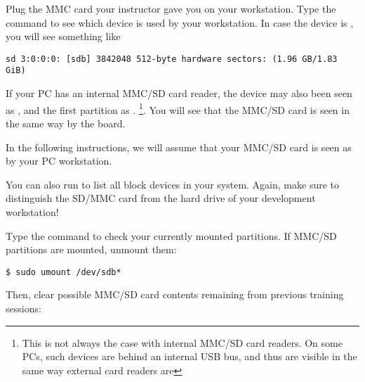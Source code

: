 Plug the MMC card your instructor gave you on your workstation. Type
the  command to see which device is used by your
workstation. In case the device is , you will see
something like

\begin{verbatim}
sd 3:0:0:0: [sdb] 3842048 512-byte hardware sectors: (1.96 GB/1.83 GiB)
\end{verbatim}

If your PC has an internal MMC/SD card reader, the device may also
been seen as , and the first partition as
. \footnote{This is not always the case with internal
  MMC/SD card readers. On some PCs, such devices are behind an
  internal USB bus, and thus are visible in the same way external card
  readers are}. You will see that the MMC/SD card is seen in the same
way by the board.

In the following instructions, we will assume that your MMC/SD card
is seen as  by your PC workstation.


You can also run  to list all block devices
in your system. Again, make sure to distinguish the SD/MMC card from
the hard drive of your development workstation!

Type the  command to check your currently mounted
partitions. If MMC/SD partitions are mounted, unmount them:

\begin{verbatim}
$ sudo umount /dev/sdb*
\end{verbatim}

Then, clear possible MMC/SD card contents remaining from previous
training sessions:

